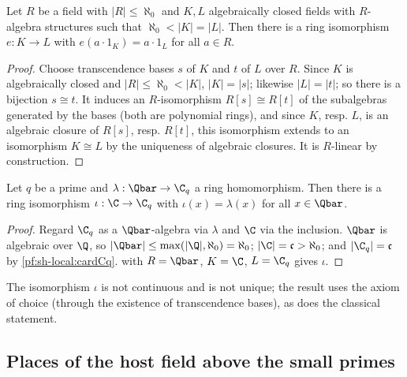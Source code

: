 \begin{lemma}[Steinitz]\label{pf:sh-local:steinitz}
Let $R$ be a field with $|R|\le\aleph_0$ and $K,L$ algebraically closed fields with $R$-algebra structures such that
$\aleph_0<|K|=|L|$. Then there is a ring isomorphism $e:K\to L$ with $e(a\cdot1_K)=a\cdot1_L$ for all $a\in R$.
\end{lemma}

\begin{proof}
Choose transcendence bases $s$ of $K$ and $t$ of $L$ over $R$. Since $K$ is algebraically closed and
$|R|\le\aleph_0<|K|$, $|K|=|s|$; likewise $|L|=|t|$; so there is a bijection $s\cong t$. It induces an
$R$-isomorphism $R[s]\cong R[t]$ of the subalgebras generated by the bases (both are polynomial rings), and since $K$,
resp. $L$, is an algebraic closure of $R[s]$, resp. $R[t]$, this isomorphism extends to an isomorphism $K\cong L$ by the
uniqueness of algebraic closures. It is $R$-linear by construction.
\end{proof}

\begin{theorem}\label{pf:sh-local:ringequiv}
Let $q$ be a prime and $\lambda:\Qbar\to\C_q$ a ring homomorphism. Then there is a ring isomorphism
$\iota:\C\to\C_q$ with $\iota(x)=\lambda(x)$ for all $x\in\Qbar$.
\end{theorem}

\begin{proof}
Regard $\C_q$ as a $\Qbar$-algebra via $\lambda$ and $\C$ via the inclusion. $\Qbar$ is algebraic over $\Q$, so
$|\Qbar|\le\max(|\Q|,\aleph_0)=\aleph_0$; $|\C|=\mathfrak c>\aleph_0$; and $|\C_q|=\mathfrak c$ by
\cref{pf:sh-local:cardCq}.  with $R=\Qbar$, $K=\C$, $L=\C_q$ gives $\iota$.
\end{proof}

The isomorphism $\iota$ is not continuous and is not unique; the result uses the axiom of choice (through the
existence of transcendence bases), as does the classical statement.

\subsection{Places of the host field above the small primes}\label{sec:pf:sh-local:host}

